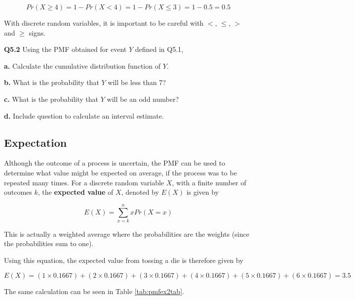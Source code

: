 \documentclass[
  oneside]{krantz}
\begin{document}
\[Pr(X \ge 4) = 1 - Pr(X < 4) = 1 - Pr(X \le 3) = 1 - 0.5 = 0.5\]

With discrete random variables, it is important to be careful with \(<\), \(\le\), \(>\) and \(\ge\) signs.

\textbf{Q5.2} Using the PMF obtained for event \(Y\) defined in Q5.1,

\textbf{a.} Calculate the cumulative distribution function of \(Y\).

\textbf{b.} What is the probability that \(Y\) will be less than 7?

\textbf{c.} What is the probability that \(Y\) will be an odd number?

\textbf{d.} Include question to calculate an interval estimate.

\hypertarget{expectation}{%
\subsection{Expectation}\label{expectation}}

Although the outcome of a process is uncertain, the PMF can be used to determine what value might be expected on average, if the process was to be repeated many times. For a discrete random variable \(X\), with a finite number of outcomes \(k\), the \textbf{expected value} of \(X\), denoted by \(E(X)\) is given by

\begin{equation}
E(X) = \sum_{x=k}^n xPr(X=x)
\label{discexpx}
\end{equation}

This is actually a weighted average where the probabilities are the weights (since the probabilities sum to one).

Using this equation, the expected value from tossing a die is therefore given by

\[E(X) = (1 \times 0.1667) + (2 \times 0.1667) + (3 \times 0.1667) + (4 \times 0.1667) + (5 \times 0.1667) + (6 \times 0.1667) = 3.5\]

The same calculation can be seen in Table \ref{tab:pmfex2tab}.
\end{document}
